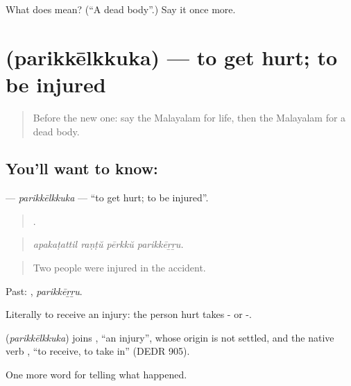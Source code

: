 \begin{tcolorbox}[breakable,colback=teal!4,colframe=teal!35!black,title={Before you move on}]
What does  mean? (\textquotedblleft{}A dead body\textquotedblright{}.) Say it once more.
\end{tcolorbox}
\section[\texorpdfstring{\ml{പരിക്കേൽക്കുക} (parikkēlkkuka)}{പരിക്കേൽക്കുക (parikkēlkkuka)}]{ (parikkēlkkuka) — to get hurt; to be injured}

\label{lesson:ML-C376-parikkelkkuka}



\begin{quote}
Before the new one: say the Malayalam for life, then the Malayalam for a dead body.
\end{quote}

\subsection*{You'll want to know: }
\textbf{} — \emph{parikkēlkkuka} — \textquotedblleft{}to get hurt; to be injured\textquotedblright{}.

\begin{quote}
   .
\end{quote}

\begin{quote}
\emph{apakaṭattil raṇṭŭ pērkkŭ parikkēṟṟu.}
\end{quote}

\begin{quote}
Two people were injured in the accident.
\end{quote}

Past: , \emph{parikkēṟṟu}.

Literally to receive an injury: the person hurt takes - or -.

\begin{cousinweb}
\textbf{} (\emph{parikkēlkkuka}) joins , \textquotedblleft{}an injury\textquotedblright{}, whose origin is not settled, and the native verb , \textquotedblleft{}to receive, to take in\textquotedblright{} (DEDR 905).
\end{cousinweb}

\begin{grammarlens}[title={What you've built}]
One more word for telling what happened.
\end{grammarlens}

